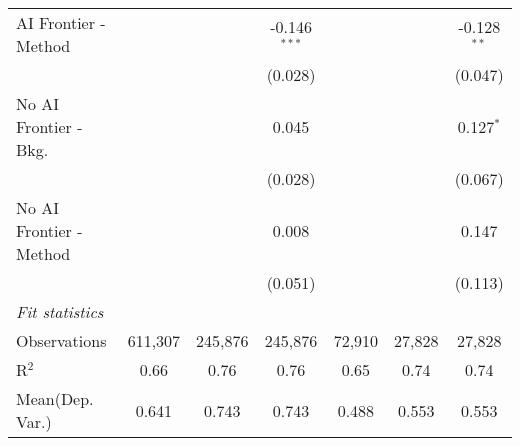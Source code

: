 \begin{tabular}{lcccccc}
   AI Frontier - Method    &                &                & -0.146$^{***}$ &                &                & -0.128$^{**}$\\   
                           &                &                & (0.028)        &                &                & (0.047)\\   
   No AI Frontier - Bkg.   &                &                & 0.045          &                &                & 0.127$^{*}$\\   
                           &                &                & (0.028)        &                &                & (0.067)\\   
   No AI Frontier - Method &                &                & 0.008          &                &                & 0.147\\   
                           &                &                & (0.051)        &                &                & (0.113)\\   
   \midrule
   \emph{Fit statistics}\\
   Observations            & 611,307        & 245,876        & 245,876        & 72,910         & 27,828         & 27,828\\  
   R$^2$                   & 0.66           & 0.76           & 0.76           & 0.65           & 0.74           & 0.74\\  
Mean(Dep. Var.) & 0.641 & 0.743 & 0.743 & 0.488 & 0.553 & 0.553 \\
   

\end{tabular}
